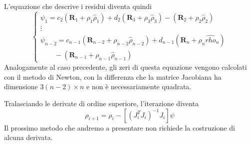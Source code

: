 \documentclass{beamer}
\begin{document}
\begin{frame}[plain]
L'equazione che descrive i residui diventa quindi 
\begin{equation}
\begin{cases}
\psi_1=c_2(\textbf{R}_1+\rho_1 \hat{\rho}_1) + d_2(\textbf{R}_3+\rho_3 \hat{\rho}_3)-(\textbf{R}_2+\rho_2 \hat{\rho}_2) \\
\vdots \\
\psi_{n-2}= c_{n-1} (\textbf{R}_{n-2}+\rho_{n-2} \hat{\rho}_{n-2}) + d_{n-1}(\textbf{R}_n+\rho_n \hat{rho}_n) \\ 
  \qquad - (\textbf{R}_{n-1}+\rho_{n-1} \hat{\rho}_{n-1})
\end{cases}
\end{equation}
Analogamente al caso precedente, gli zeri di questa equazione vengono calcolati con il metodo di Newton, con la differenza che la matrice Jacobiana ha dimensione $3(n-2) \times n$ e non \`e necessariamente quadrata. 
\end{frame}

\begin{frame}[plain]
Tralasciando le derivate di ordine superiore, l'iterazione diventa \begin{equation}
\rho_{i+1}=\rho_i - [(J_i^T J_i)^{-1}J_i]\psi
\end{equation}
Il prossimo metodo che andremo a presentare non richiede la costruzione di alcuna derivata.
\end{frame}


\end{document}
